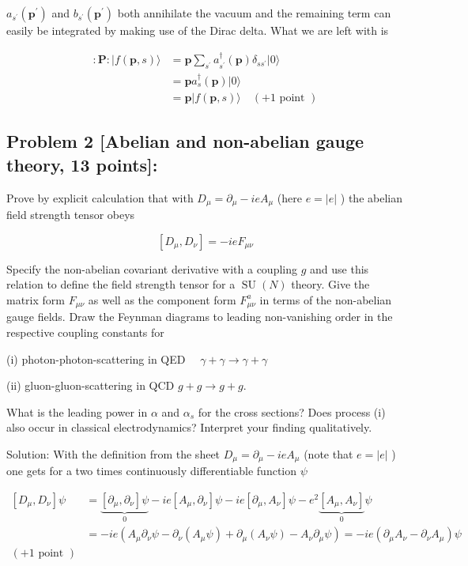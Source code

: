 \documentclass[10pt, letterpaper]{article}
\begin{document}
$a_{s^{\prime}}\left(\mathbf{p}^{\prime}\right)$ and $b_{s^{\prime}}\left(\mathbf{p}^{\prime}\right)$ both annihilate the vacuum and the remaining term can easily be integrated by making use of the Dirac delta. What we are left with is

$$
\begin{aligned}
: \mathbf{P}:|f(\mathbf{p}, s)\rangle & =\mathbf{p} \sum_{s^{\prime}} a_{s^{\prime}}^{\dagger}(\mathbf{p}) \delta_{s s^{\prime}}|0\rangle \\
& =\mathbf{p} a_s^{\dagger}(\mathbf{p})|0\rangle \\
& =\mathbf{p}|f(\mathbf{p}, s)\rangle \quad(+1 \text { point })
\end{aligned}
$$




\subsection{Problem 2 [Abelian and non-abelian gauge theory, 13 points]:}
Prove by explicit calculation that with $D_\mu=\partial_\mu-i e A_\mu$ (here $e=|e|$ ) the abelian field strength tensor obeys

$$
\left[D_\mu, D_\nu\right]=-i e F_{\mu \nu}
$$


Specify the non-abelian covariant derivative with a coupling $g$ and use this relation to define the field strength tensor for a $\operatorname{SU}(N)$ theory. Give the matrix form $F_{\mu \nu}$ as well as the component form $F_{\mu \nu}^a$ in terms of the non-abelian gauge fields.
Draw the Feynman diagrams to leading non-vanishing order in the respective coupling constants for

(i) photon-photon-scattering in QED $\quad \gamma+\gamma \longrightarrow \gamma+\gamma$

(ii) gluon-gluon-scattering in QCD $g+g \longrightarrow g+g$.

What is the leading power in $\alpha$ and $\alpha_s$ for the cross sections? Does process (i) also occur in classical electrodynamics? Interpret your finding qualitatively.



Solution: With the definition from the sheet $D_\mu=\partial_\mu-i e A_\mu$ (note that $e=|e|$ ) one gets for a two times continuously differentiable function $\psi$

$$
\begin{aligned}
{\left[D_\mu, D_\nu\right] \psi } & =\underbrace{\left[\partial_\mu, \partial_\nu\right] \psi}_0-i e\left[A_\mu, \partial_\nu\right] \psi-i e\left[\partial_\mu, A_\nu\right] \psi-e^2 \underbrace{\left[A_\mu, A_\nu\right]}_0 \psi \\
& =-i e\left(A_\mu \partial_\nu \psi-\partial_\nu\left(A_\mu \psi\right)+\partial_\mu\left(A_\nu \psi\right)-A_\nu \partial_\mu \psi\right)=-i e\left(\partial_\mu A_\nu-\partial_\nu A_\mu\right) \psi \\
(+1 \text { point }) &
\end{aligned}
$$
\end{document}
